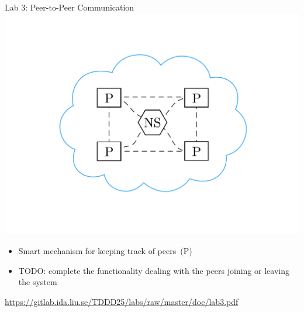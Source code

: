 \documentclass[compress,xcolor=table]{beamer}
\begin{document}
\begin{frame}{Lab 3: Peer-to-Peer Communication}
  \centering
  \includegraphics[scale=0.10,page=1]{include/assets/chat}
  \begin{itemize}
    \item Smart mechanism for keeping track of peers~(P)
    \item \alert{TODO}: complete the functionality dealing with the peers
    joining or leaving the system
  \end{itemize}
  \begin{center}
    \scriptsize \url{https://gitlab.ida.liu.se/TDDD25/labs/raw/master/doc/lab3.pdf}
  \end{center}
\end{frame}
\end{document}
